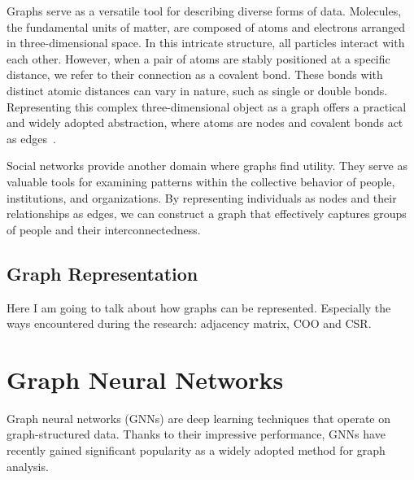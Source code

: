 Graphs serve as a versatile tool for describing diverse forms of data.
Molecules, the fundamental units of matter, are composed of atoms and electrons arranged in three-dimensional space.
In this intricate structure, all particles interact with each other.
However, when a pair of atoms are stably positioned at a specific distance, we refer to their connection as a covalent bond.
These bonds with distinct atomic distances can vary in nature, such as single or double bonds.
Representing this complex three-dimensional object as a graph offers a practical and widely adopted abstraction, where atoms are nodes and covalent bonds act as edges~\cite{DBLP:journals/corr/DuvenaudMAGHAA15}.

Social networks provide another domain where graphs find utility.
They serve as valuable tools for examining patterns within the collective behavior of people, institutions, and organizations.
By representing individuals as nodes and their relationships as edges, we can construct a graph that effectively captures groups of people and their interconnectedness.

\subsection{Graph Representation}
\label{subsec:graph_representation}

Here I am going to talk about how graphs can be represented.
Especially the ways encountered during the research: adjacency matrix, COO and CSR.


\section{Graph Neural Networks}
\label{sec:graph_neural_networks}%


Graph neural networks (GNNs) are deep learning techniques that operate on graph-structured data.
Thanks to their impressive performance, GNNs have recently gained significant popularity as a widely adopted method for graph analysis.

